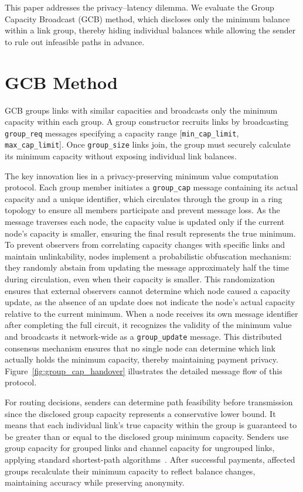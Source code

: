 \documentclass[conference]{IEEEtran}
\newcommand{\groupcap}{\texttt{group\_cap}}
\newcommand{\groupupdate}{\texttt{group\_update}}
\newcommand{\groupreq}{\texttt{group\_req}}
\newcommand{\groupsize}{\texttt{group\_size}}
\newcommand{\mincaplimit}{\texttt{min\_cap\_limit}}
\newcommand{\maxcaplimit}{\texttt{max\_cap\_limit}}
\begin{document}
This paper addresses the privacy–latency dilemma.
We evaluate the Group Capacity Broadcast (GCB) method, which discloses only the minimum balance within a link group, thereby hiding individual balances while allowing the sender to rule out infeasible paths in advance.

\section{GCB Method}

GCB groups links with similar capacities and broadcasts only the minimum capacity within each group.
A group constructor recruits links by broadcasting \groupreq{} messages specifying a capacity range [\mincaplimit{}, \maxcaplimit{}].
Once \groupsize{} links join, the group must securely calculate its minimum capacity without exposing individual link balances.

The key innovation lies in a privacy-preserving minimum value computation protocol.
Each group member initiates a \groupcap{} message containing its actual capacity and a unique identifier, which circulates through the group in a ring topology to ensure all members participate and prevent message loss.
As the message traverses each node, the capacity value is updated only if the current node's capacity is smaller, ensuring the final result represents the true minimum.
To prevent observers from correlating capacity changes with specific links and maintain unlinkability, nodes implement a probabilistic obfuscation mechanism: they randomly abstain from updating the message approximately half the time during circulation, even when their capacity is smaller. This randomization ensures that external observers cannot determine which node caused a capacity update, as the absence of an update does not indicate the node's actual capacity relative to the current minimum.
When a node receives its own message identifier after completing the full circuit, it recognizes the validity of the minimum value and broadcasts it network-wide as a \groupupdate{} message.
This distributed consensus mechanism ensures that no single node can determine which link actually holds the minimum capacity, thereby maintaining payment privacy.
Figure~\ref{fig:group_cap_handover} illustrates the detailed message flow of this protocol.

For routing decisions, senders can determine path feasibility before transmission since the disclosed group capacity represents a conservative lower bound.
It means that each individual link's true capacity within the group is guaranteed to be greater than or equal to the disclosed group minimum capacity.
Senders use group capacity for grouped links and channel capacity for ungrouped links, applying standard shortest-path algorithms~\cite{lnd,eclair,clightning}.
After successful payments, affected groups recalculate their minimum capacity to reflect balance changes, maintaining accuracy while preserving anonymity.
\end{document}

